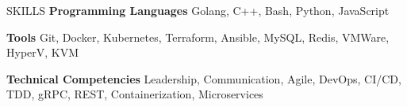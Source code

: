 \documentclass{resume} %
\begin{document}
\begin{rSection}{SKILLS}
\textbf{Programming Languages}
\null\hfill Golang, C++, Bash, Python, JavaScript

\textbf{Tools}
\null\hfill Git, Docker, Kubernetes, Terraform, Ansible, MySQL, Redis, VMWare, HyperV, KVM

\textbf{Technical Competencies}
\null\hfill Leadership, Communication, Agile, DevOps, CI/CD, TDD, gRPC, REST, Containerization, Microservices

\end{rSection}
\end{document}

